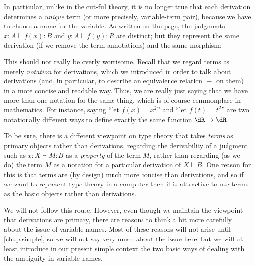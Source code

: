 \documentclass{book}
\def\idfunc{\mathsf{id}}
\let\types\vdash
\begin{document}
In particular, unlike in the cut-ful theory, it is no longer true that each derivation determines a \emph{unique} term (or more precisely, variable-term pair), because we have to choose a name for the variable.
As written on the page, the judgments $x:A \types f(x):B$ and $y:A \types f(y):B$ are distinct; but they represent the same derivation (if we remove the term annotations) and the same morphism:

This should not really be overly worrisome.
Recall that we regard terms as merely \emph{notation} for derivations, which we introduced in order to talk about derivations (and, in particular, to describe an equivalence relation $\equiv$ on them) in a more concise and readable way.
Thus, we are really just saying that we have more than one notation for the same thing, which is of course commonplace in mathematics.
For instance, saying ``let $f(x)=x^2$'' and ``let $f(t)=t^2$'' are two notationally different ways to define exactly the same function $\dR\to\dR$.

To be sure, there is a different viewpoint on type theory that takes \emph{terms} as primary objects rather than derivations, regarding the derivability of a judgment such as $x:X\types M:B$ as a \emph{property} of the term $M$, rather than regarding (as we do) the term $M$ as a notation for a particular derivation of $X\types B$.
One reason for this is that terms are (by design) much more concise than derivations, and so if we want to represent type theory in a computer then it is attractive to use terms as the basic objects rather than derivations.

We will not follow this route.
However, even though we maintain the viewpoint that derivations are primary, there are reasons to think a bit more carefully about the issue of variable names.
Most of these reasons will not arise until \cref{chap:simple}, so we will not say very much about the issue here; but we will at least introduce in our present simple context the two basic ways of dealing with the ambiguity in variable names.
\end{document}
